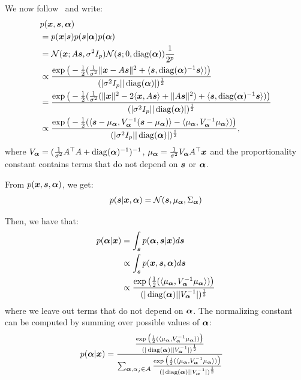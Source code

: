 We now follow~\cite{moulines1997maximum} and write:
\begin{align}
  &p(\xb, \sbb, \alphab) \\
  &= p(\xb | \sbb) p(\sbb|\alphab)p(\alphab) \\
                        &= \Ncal(\xb; A\sbb, \sigma^2 I_p)\mathcal{N}( \sbb; 0, \diag(\alphab)) \frac1{2^p} \\
  &\propto \frac{\exp\big(-\frac12(\frac1{ \sigma^2}\|\xb - A\sbb \|^2 + \dotp{ \sbb }{ \diag(\alphab)^{-1} \sbb})\big)}{(|\sigma^2 I_p| |\diag(\alphab)|)^{\frac12}}  \\
  &= \frac{\exp\big(-\frac12(\frac1{ \sigma^2}(\|\xb \|^2 - 2 \dotp{ \xb}{ A \sbb } + \|A \sbb \|^2)  + \dotp{ \sbb }{ \diag(\alphab)^{-1} \sbb}) \big)}{(|\sigma^2 I_p| |\diag(\alphab)|)^{\frac12}} \\
  &\propto \frac{\exp\big(-\frac12( \dotp{ \sbb - \mu_{\alphab}}{ V_{\alphab}^{-1} (\sbb - \mu_{\alphab}) } - \dotp{ \mu_{\alphab} }{V_{\alphab}^{-1} \mu_{\alphab} }) \big)}{(|\sigma^2 I_p| |\diag(\alphab)|)^{\frac12}},
\end{align}
where $V_{\alphab} = (\frac1{\sigma^2}A^{\top}A + \diag(\alphab)^{-1})^{-1}$, $\mu_{\alphab} = \frac1{\sigma^2}V_{\alphab}
A^{\top} \xb$ and the proportionality constant contains terms that do not depend
on $\sbb$ or $\alphab$.

From $p(\xb, \sbb, \alphab)$, we get:
\begin{align}
  p(\sbb | \xb, \alphab) =  \Ncal(\sbb, \mu_{\alphab}, \Sigma_{\alphab})
\end{align}

Then, we have that:
\begin{align}
  p(\alphab | \xb) &= \int_{\sbb} p(\alphab, \sbb | \xb) d\sbb \\
                    &\propto \int_{\sbb} p(\xb, \sbb ,\alphab) d\sbb \\ 
                   &\propto \frac{\exp\big(\frac12(\dotp{ \mu_{\alphab} }{V_{\alphab}^{-1} \mu_{\alphab} }) \big)}{(|\diag(\alphab)| |V_{\alphab}^{-1}|)^{\frac12}}\\ 
\end{align}
where we leave out terms that do not depend on $\alphab$.
The normalizing constant can be computed by summing over possible values of
$\alphab$:
\begin{align}
  p(\alphab | \xb) &= \frac{\frac{\exp\big(\frac12(\dotp{ \mu_{\alphab} }{V_{\alphab}^{-1} \mu_{\alphab} }) \big)}{(|\diag(\alphab)| |V_{\alphab}^{-1}|)^{\frac12}}}{\sum_{\alphab, \alpha_j \in \mathcal{A}} \frac{\exp\big(\frac12(\dotp{ \mu_{\alphab} }{V_{\alphab}^{-1} \mu_{\alphab} }) \big)}{(|\diag(\alphab)| |V_{\alphab}^{-1}|)^{\frac12}}}
\end{align}

